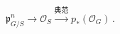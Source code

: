 \(
\mathfrak p^n_{G/S}
  \longrightarrow
\mathcal O_S
  \xrightarrow{\text{典范}}
p_*(\mathcal O_G)\,.
\)
